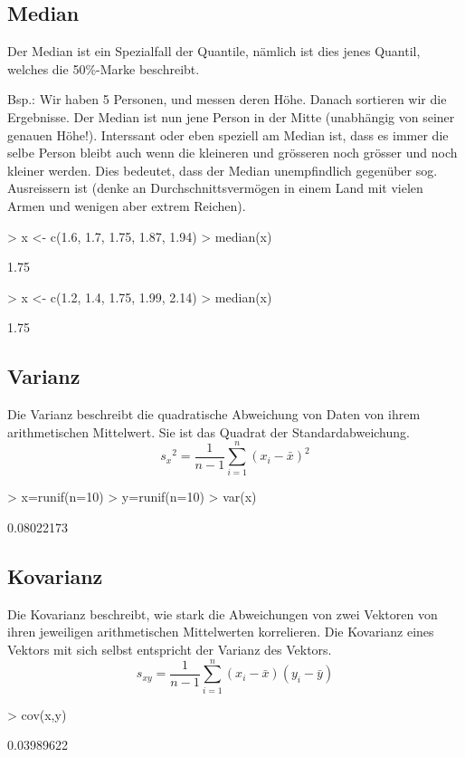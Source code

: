 \subsection{Median}
Der Median ist ein Spezialfall der Quantile, nämlich ist dies jenes Quantil,
welches die 50\%-Marke beschreibt.

Bsp.: Wir haben 5 Personen, und messen deren Höhe. Danach sortieren wir die
Ergebnisse. Der Median ist nun jene Person in der Mitte (unabhängig von seiner
genauen Höhe!). Interssant oder eben speziell am Median ist,
dass es immer die selbe Person bleibt auch wenn die kleineren und grösseren
noch grösser und noch kleiner werden. Dies bedeutet, dass der Median 
unempfindlich gegenüber sog. Ausreissern ist (denke an Durchschnittsvermögen
in einem Land mit vielen Armen und wenigen aber extrem Reichen).
\begin{Schunk}
\begin{Sinput}
> x <- c(1.6, 1.7, 1.75, 1.87, 1.94)
> median(x)
\end{Sinput}
\begin{Soutput}
[1] 1.75
\end{Soutput}
\begin{Sinput}
> x <- c(1.2, 1.4, 1.75, 1.99, 2.14)
> median(x)
\end{Sinput}
\begin{Soutput}
[1] 1.75
\end{Soutput}
\end{Schunk}

\subsection{Varianz}
Die Varianz beschreibt die quadratische Abweichung von Daten von ihrem 
arithmetischen Mittelwert. Sie ist das Quadrat der Standardabweichung. 
\[ {s_x}^2 = \frac{1}{n-1} \sum\limits_{i=1}^{n} (x_i - \bar{x})^2 \]
\begin{Schunk}
\begin{Sinput}
> x=runif(n=10)
> y=runif(n=10)
> var(x)
\end{Sinput}
\begin{Soutput}
[1] 0.08022173
\end{Soutput}
\end{Schunk}

\subsection{Kovarianz}
Die Kovarianz beschreibt, wie stark die Abweichungen von zwei Vektoren von 
ihren jeweiligen arithmetischen Mittelwerten korrelieren. Die Kovarianz 
eines Vektors mit sich selbst entspricht der Varianz des Vektors. 
\[ s_{xy} 
= \frac{1}{n-1} \sum\limits_{i=1}^{n} (x_i - \bar{x}) (y_i - \bar{y}) \]
\begin{Schunk}
\begin{Sinput}
> cov(x,y)
\end{Sinput}
\begin{Soutput}
[1] 0.03989622
\end{Soutput}
\end{Schunk}

